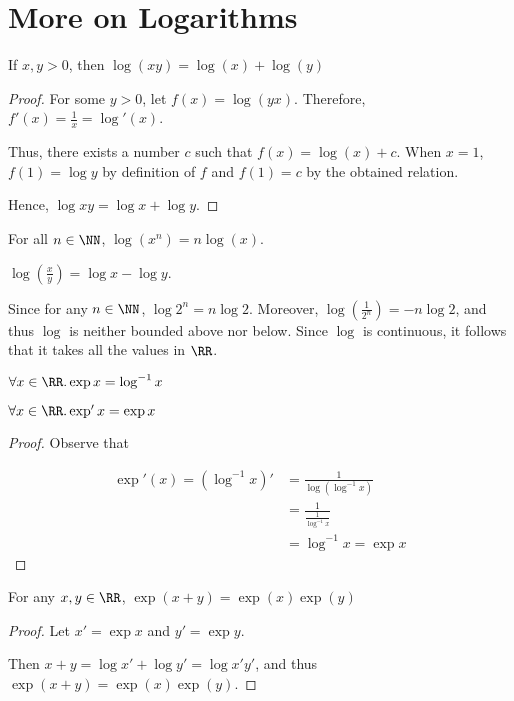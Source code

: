 \documentclass[11pt]{scrartcl}
\begin{document}
\section{More on Logarithms}

\begin{theorem}
If $x, y > 0$, then $\log(xy) = \log(x) + \log(y)$
\end{theorem}

\begin{proof}
  For some $y > 0$, let $f(x) = \log(yx)$. Therefore, $f'(x) = \frac{1}{x} = \log'(x)$.

  Thus, there exists a number $c$ such that $f(x) = \log(x) + c$. When
  $x=1$, $f(1) = \log y$ by definition of $f$ and $f(1)=c$ by the obtained relation.

  Hence, $\log xy = \log x + \log y$.
\end{proof}

\begin{corollary}
For all $n\in \NN$, $\log(x^n) = n\log(x)$.
\end{corollary}

\begin{corollary}
$\log(\frac{x}{y}) = \log x - \log y$.
\end{corollary}

Since for any $n\in \NN$, $\log 2^n = n\log 2$. Moreover,
$\log(\frac{1}{2^n}) = -n \log 2$, and thus $\log$ is neither bounded
above nor below. Since $\log$ is continuous, it follows that it takes
all the values in $\RR$.

\begin{definition}
$\forall x\in \RR.\exp x = \log ^{-1} x$ 
\end{definition}

\begin{theorem}
$\forall x\in\RR.\exp' x = \exp x$
\end{theorem}

\begin{proof}
  Observe that

  \begin{align}
    \exp'(x) = (\log^{-1}x)' & = \frac{1}{\log(\log^{-1} x)}    \\
                             & =\frac{1}{\frac{1}{\log^{-1} x}} \\
                             & =\log^{-1}x  = \exp x
  \end{align}
\end{proof}

\begin{theorem}
  \label{sec:more-logarithms}
For any $x, y\in\RR$, $\exp(x+y) = \exp(x)\exp(y)$
\end{theorem}
\begin{proof}
  Let $x' = \exp x$ and $y' = \exp y$.

  Then  $x+y = \log x' +\log y' = \log x'y'$, and thus $\exp(x+y) = \exp(x)\exp(y)$.
\end{proof}
\end{document}
